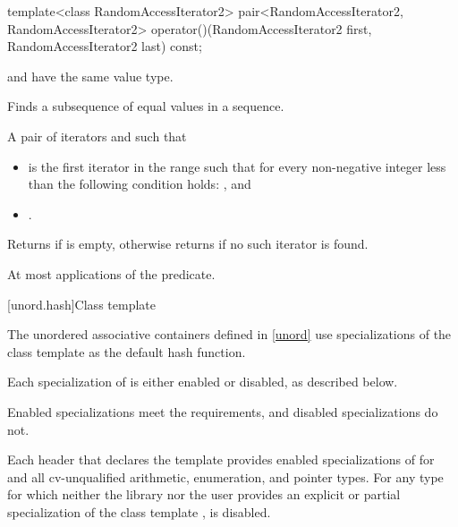 %
\begin{itemdecl}
template<class RandomAccessIterator2>
  pair<RandomAccessIterator2, RandomAccessIterator2>
    operator()(RandomAccessIterator2 first, RandomAccessIterator2 last) const;
\end{itemdecl}

\begin{itemdescr}
\pnum
\mandates
{} and 
have the same value type.

\pnum
\effects
Finds a subsequence of equal values in a sequence.

\pnum
\returns
A pair of iterators  and  such that
\begin{itemize}
\item {} is the first iterator in the range
 such that
for every non-negative integer  less than 
the following condition holds:
, and
\item {}.
\end{itemize}
Returns  if  is empty,
otherwise returns  if no such iterator is found.

\pnum
\complexity
At most  applications of the predicate.
\end{itemdescr}

[unord.hash]{Class template }

\pnum
{}%
%
The unordered associative containers defined in \ref{unord} use
specializations of the class template 
as the default hash function.

\pnum
Each specialization of  is either enabled or disabled,
as described below.
\begin{note}
Enabled specializations meet the  requirements, and
disabled specializations do not.
\end{note}
Each header that declares the template 
provides enabled specializations of  for  and
all cv-unqualified arithmetic, enumeration, and pointer types.
For any type  for which neither the library nor the user provides
an explicit or partial specialization of the class template ,
 is disabled.

